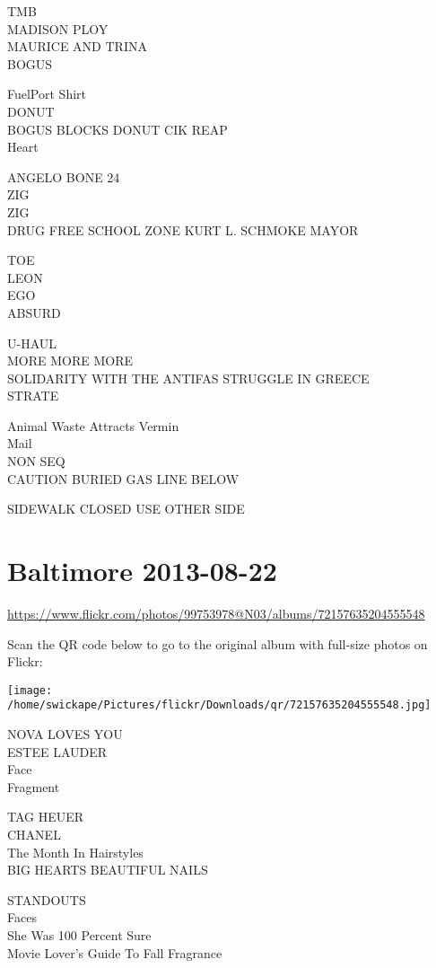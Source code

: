 \documentclass[10pt,letterpaper]{article}
\begin{document}
TMB\\
MADISON PLOY\\
MAURICE AND TRINA\\
BOGUS

FuelPort Shirt\\
DONUT\\
BOGUS BLOCKS DONUT CIK REAP\\
Heart

ANGELO BONE 24\\
ZIG\\
ZIG\\
DRUG FREE SCHOOL ZONE KURT L. SCHMOKE MAYOR

TOE\\
LEON\\
EGO\\
ABSURD

U{-}HAUL\\
MORE MORE MORE\\
SOLIDARITY WITH THE ANTIFAS STRUGGLE IN GREECE\\
STRATE

Animal Waste Attracts Vermin\\
Mail\\
NON SEQ\\
CAUTION BURIED GAS LINE BELOW

SIDEWALK CLOSED USE OTHER SIDE


\section*{Baltimore 2013-08-22}

\url{https://www.flickr.com/photos/99753978@N03/albums/72157635204555548}

Scan the QR code below to go to the original album with full-size photos on Flickr:

\texttt{[image: /home/swickape/Pictures/flickr/Downloads/qr/72157635204555548.jpg]}


NOVA LOVES YOU\\
ESTEE LAUDER\\
Face\\
Fragment

TAG HEUER\\
CHANEL\\
The Month In Hairstyles\\
BIG HEARTS BEAUTIFUL NAILS

STANDOUTS\\
Faces\\
She Was 100 Percent Sure\\
Movie Lover's Guide To Fall Fragrance
\end{document}

